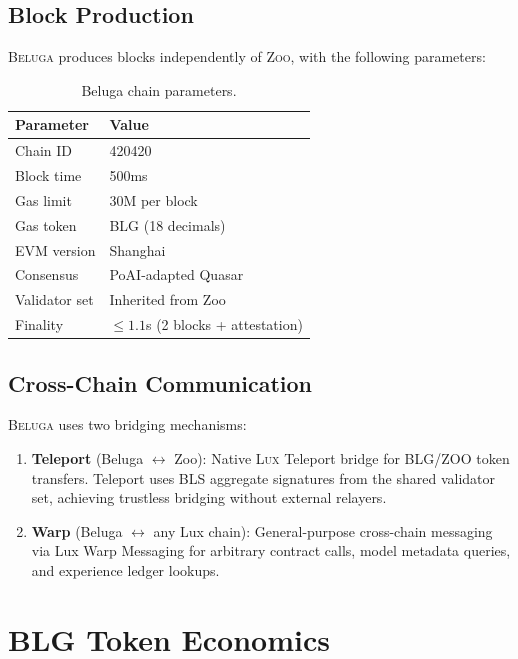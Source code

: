 \documentclass[11pt,letterpaper]{article}
\newcommand{\Zoo}{\textsc{Zoo}}
\newcommand{\Lux}{\textsc{Lux}}
\newcommand{\Beluga}{\textsc{Beluga}}
\begin{document}
\subsection{Block Production}

\Beluga{} produces blocks independently of \Zoo{}, with the following parameters:

\begin{table}[h]
\centering
\caption{Beluga chain parameters.}
\label{tab:params}
\begin{tabular}{@{}ll@{}}
\toprule
Parameter & Value \\
\midrule
Chain ID & 420420 \\
Block time & 500ms \\
Gas limit & 30M per block \\
Gas token & BLG (18 decimals) \\
EVM version & Shanghai \\
Consensus & PoAI-adapted Quasar \\
Validator set & Inherited from Zoo \\
Finality & $\leq 1.1$s (2 blocks + attestation) \\
\bottomrule
\end{tabular}
\end{table}

\subsection{Cross-Chain Communication}

\Beluga{} uses two bridging mechanisms:

\begin{enumerate}
    \item \textbf{Teleport} (Beluga $\leftrightarrow$ Zoo): Native \Lux{} Teleport bridge \cite{lux-teleport} for BLG/ZOO token transfers. Teleport uses BLS aggregate signatures from the shared validator set, achieving trustless bridging without external relayers.
    \item \textbf{Warp} (Beluga $\leftrightarrow$ any Lux chain): General-purpose cross-chain messaging via Lux Warp Messaging for arbitrary contract calls, model metadata queries, and experience ledger lookups.
\end{enumerate}

\section{BLG Token Economics}\label{sec:token}
\end{document}
